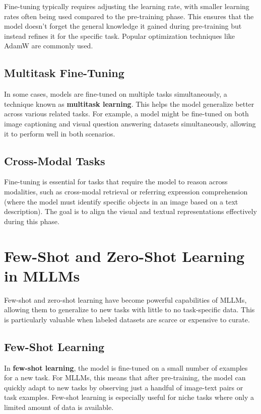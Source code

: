 Fine-tuning typically requires adjusting the learning rate, with smaller learning rates often being used compared to the pre-training phase. This ensures that the model doesn’t forget the general knowledge it gained during pre-training but instead refines it for the specific task. Popular optimization techniques like AdamW are commonly used.

\subsection{Multitask Fine-Tuning}

In some cases, models are fine-tuned on multiple tasks simultaneously, a technique known as \textbf{multitask learning}. This helps the model generalize better across various related tasks. For example, a model might be fine-tuned on both image captioning and visual question answering datasets simultaneously, allowing it to perform well in both scenarios.

\subsection{Cross-Modal Tasks}

Fine-tuning is essential for tasks that require the model to reason across modalities, such as cross-modal retrieval or referring expression comprehension (where the model must identify specific objects in an image based on a text description). The goal is to align the visual and textual representations effectively during this phase.

\section{Few-Shot and Zero-Shot Learning in MLLMs}

Few-shot and zero-shot learning have become powerful capabilities of MLLMs, allowing them to generalize to new tasks with little to no task-specific data. This is particularly valuable when labeled datasets are scarce or expensive to curate.

\subsection{Few-Shot Learning}

In \textbf{few-shot learning}, the model is fine-tuned on a small number of examples for a new task. For MLLMs, this means that after pre-training, the model can quickly adapt to new tasks by observing just a handful of image-text pairs or task examples. Few-shot learning is especially useful for niche tasks where only a limited amount of data is available.

